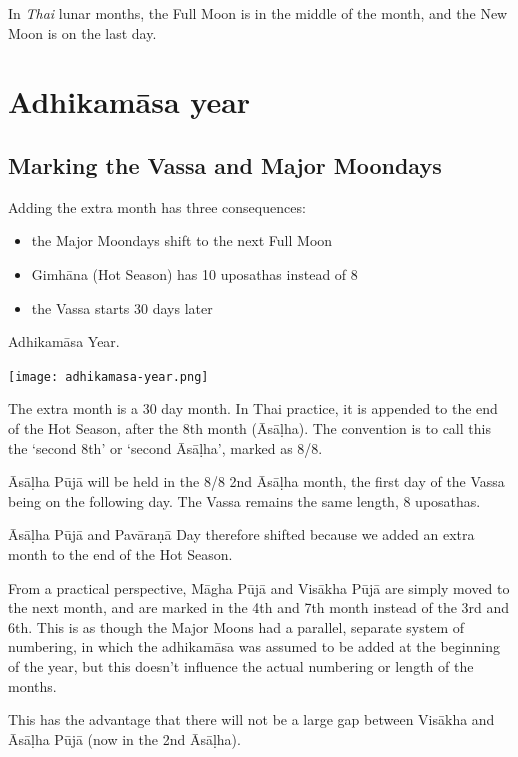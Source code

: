 \documentclass[11pt,oneside]{memoir-article}
\begin{document}
In \emph{Thai} lunar months, the Full Moon is in the middle of the month, and the New
Moon is on the last day.

\section{Adhikamāsa year}
\label{sec-1-3}
\subsection{Marking the Vassa and Major Moondays}
\label{sec-1-3-1}
\label{marking-the-moondays-adhikamasa-year}

Adding the extra month has three consequences:

\begin{itemize}
\item the Major Moondays shift to the next Full Moon
\item Gimhāna (Hot Season) has 10 uposathas instead of 8
\item the Vassa starts 30 days later
\end{itemize}

\clearpage

\begin{marginfigure}[-22mm]
\caption{\label{fig-adhikamasa-year} Adhikamāsa Year.}
\texttt{[image: adhikamasa-year.png]}
\end{marginfigure}

The extra month is a 30 day month. In Thai practice, it is appended to the end
of the Hot Season, after the 8th month (Āsāḷha). The convention is to call this
the `second 8th' or `second Āsāḷha', marked as 8/8.

Āsāḷha Pūjā will be held in the 8/8 2nd Āsāḷha month, the first day of the
Vassa being on the following day. The Vassa remains the same length, 8 uposathas.

Āsāḷha Pūjā and Pavāraṇā Day therefore shifted because we added an extra month
to the end of the Hot Season.

From a practical perspective, Māgha Pūjā and Visākha Pūjā are simply moved to
the next month, and are marked in the 4th and 7th month instead of the 3rd and
6th. This is as though the Major Moons had a parallel, separate system of
numbering, in which the adhikamāsa was assumed to be added at the beginning of
the year, but this doesn't influence the actual numbering or length of the
months.

This has the advantage that there will not be a large gap between Visākha and
Āsāḷha Pūjā (now in the 2nd Āsāḷha).
\end{document}
